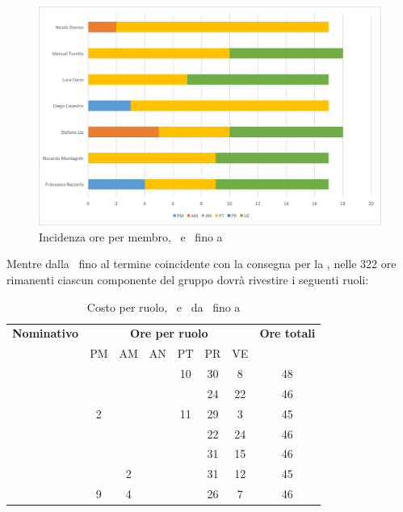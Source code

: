 \begin{figure}[H]
	\centering 
	\includegraphics[scale=0.7]{Immagini/GraficiPianoLavoro/PD.png}
	\caption{Incidenza ore per membro, \PD\ e \COD\ fino a \RP}
\end{figure}

\newpage
Mentre dalla \RP\ fino al termine coincidente con la consegna per la \RQ, nelle 322 ore rimanenti ciascun componente del gruppo dovrà rivestire i seguenti ruoli:

\begin{table}[h]
	\begin{center}
		\begin{tabular}{|c|c|c|c|c|c|c|c|}
			\hline
			\textbf{Nominativo} & \multicolumn{6}{c|}{\textbf{Ore per ruolo}} & \textbf{Ore totali} \\
					& PM & AM & AN & PT & PR & VE & \\
			\hline
			\FB		&	 &	  &	   & 10	& 30 &	8  &	48	\\
			\hline
			\RM		&	 &	  &	   & 	& 24 & 22 & 46	\\
			\hline
			\SL		& 2  &	  &	   & 11	& 29 & 3  &	45	\\
			\hline
			\DC		&	 &	  &	   &	& 22 & 24 &	46	\\
			\hline
			\LD 	&	 &	  &	   &	& 31 & 15 &	46	\\
			\hline
			\MT		& 	 & 2  &	   &	& 31 & 12  &	45	\\
			\hline
			\ND 	& 9	 & 4  &	   &	& 26 & 7   & 46	\\
			\hline
		\end{tabular}
	\end{center}
	\caption{Costo per ruolo, \PD\ e \COD\ da \RP\ fino a \RQ}
\end{table}

